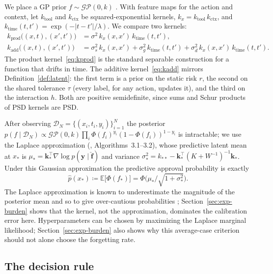 \documentclass[11pt]{article}
\begin{document}
We place a GP prior $f \sim \mathcal{GP}(0, k)$ \citep{rasmussen2006gaussian}.
With feature maps for the action and context, let $k_{\text{tool}}$ and
$k_{\text{ctx}}$ be squared-exponential kernels, $k_x = k_{\text{tool}}\,k_{\text{ctx}}$,
and $k_{\text{time}}(t,t') = \exp(-|t-t'|/\lambda)$. We compare two kernels:
\begin{align}
  k_{\text{prod}}\bigl((x,t),(x',t')\bigr) &= \sigma^2\, k_x(x,x')\, k_{\text{time}}(t,t'),
  \label{eq:kprod}\\
  k_{\text{add}}\bigl((x,t),(x',t')\bigr) &= \sigma_s^2\, k_x(x,x')
     + \sigma_g^2\, k_{\text{time}}(t,t')
     + \sigma_d^2\, k_x(x,x')\, k_{\text{time}}(t,t').
  \label{eq:kadd}
\end{align}
The product kernel~\eqref{eq:kprod} is the standard separable construction
for a function that drifts in time. The additive kernel~\eqref{eq:kadd}
mirrors Definition~\ref{def:latent}: the first term is a prior on the static
risk $r$, the second on the shared tolerance $\tau$ (every label, for any
action, updates it), and the third on the interaction $h$. Both are positive
semidefinite, since sums and Schur products of PSD kernels are PSD.

After observing $\mathcal{D}_N = \{(x_i, t_i, y_i)\}_{i=1}^N$ the posterior
$p(f \mid \mathcal{D}_N) \propto \mathcal{GP}(0,k)\prod_i
\Phi(f_i)^{y_i}(1-\Phi(f_i))^{1-y_i}$ is intractable; we use the Laplace
approximation (\citealp{rasmussen2006gaussian}, Algorithms~3.1--3.2), whose
predictive latent mean at $x_*$ is $\mu_* = \mathbf{k}_*^\top
\nabla \log p(\mathbf{y}\mid\hat{\mathbf f})$ and variance $\sigma_*^2 =
k_{**} - \mathbf{k}_*^\top (K + W^{-1})^{-1}\mathbf{k}_*$. Under this Gaussian
approximation the predictive approval probability is exactly
\begin{equation}
  \hat p(x_*) \coloneqq \mathbb{E}\bigl[\Phi(f_*)\bigr]
  = \Phi\bigl(\mu_* / \sqrt{1 + \sigma_*^2}\bigr).
\end{equation}
The Laplace approximation is known to underestimate the magnitude of the
posterior mean and so to give over-cautious probabilities
\citep{kuss2005assessing}; Section~\ref{sec:exp-burden} shows that the
kernel, not the approximation, dominates the calibration error here.
Hyperparameters can be chosen by maximizing the Laplace marginal likelihood;
Section~\ref{sec:exp-burden} also shows why this average-case criterion
should not alone choose the forgetting rate.

\subsection{The decision rule}\label{sec:rule}
\end{document}
